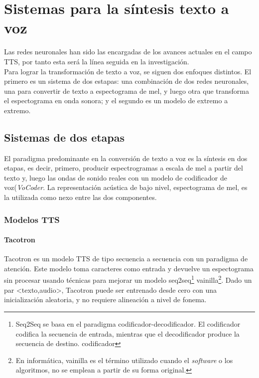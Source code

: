 \chapter{Sistemas para la síntesis texto a voz}\label{chapter:state-of-the-art}

Las redes neuronales han sido las encargadas de los avances actuales en el campo TTS, por tanto esta será la línea seguida en la investigación. \\

Para lograr la transformación de texto a voz, se siguen dos enfoques distintos. El primero es un sistema de dos estapas: una combinación de dos redes neuronales, una para convertir de texto a espectograma de mel, y luego otra que transforma el espectograma en onda sonora; y el segundo es un modelo de extremo a extremo.  

\section{Sistemas de dos etapas}

El paradigma predominante en la conversión de texto a voz es la síntesis en dos etapas, es decir, primero, producir espectrogramas a escala de mel a partir del texto y, luego las ondas de sonido reales con un modelo de codificador de voz(\textit{VoCoder}. La representación acústica de bajo nivel, espectograma de mel, es la utilizada como nexo entre las dos componentes.


\subsection{Modelos TTS}

\subsubsection{Tacotron}

Tacotron es un modelo TTS de tipo secuencia a secuencia con un paradigma de atención. Este modelo toma caracteres como entrada y devuelve un espectograma sin procesar usando técnicas para mejorar un modelo seq2seq\footnote{Seq2Seq se basa en el paradigma codificador-decodificador. El codificador codifica la secuencia de entrada, mientras que el decodificador produce la secuencia de destino. codificador} vainilla\footnote{En informática, vainilla es el término utilizado cuando el \textit{software} o los algoritmos, no se emplean a partir de su forma original.}. Dado un par <texto,audio>, Tacotron puede ser entrenado desde cero con una inicialización aleatoria, y no requiere alineación a nivel de fonema.\\


